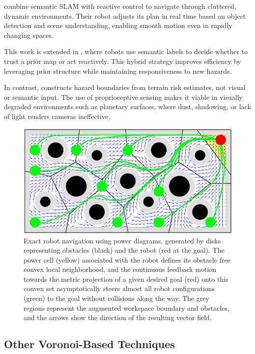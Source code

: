 \textcite{Vasilopoulos_RAL_2020} combine semantic SLAM with reactive control to navigate through cluttered, dynamic environments. Their robot adjusts its plan in real time based on object detection and scene understanding, enabling smooth motion even in rapidly changing spaces.

This work is extended in \textcite{vasilopoulos2021reactivenavigationpartiallyfamiliar}, where robots use semantic labels to decide whether to trust a prior map or act reactively. This hybrid strategy improves efficiency by leveraging prior structure while maintaining responsiveness to new hazards.

In contrast, \algoname{} constructs hazard boundaries from terrain risk estimates, not visual or semantic input. The use of proprioceptive sensing makes it viable in visually degraded environments such as planetary surfaces, where dust, shadowing, or lack of light renders cameras ineffective.

\begin{figure}[h]
\centering
\includegraphics[width=0.7\linewidth]{figures/Exact-robot-navigation-using-power-diagrams-generated-by-disks-representing-obstacles.png}
\caption{Exact robot navigation using power diagrams, generated by disks representing obstacles (black) and the robot (red at the goal). The power cell (yellow) associated with the robot defines its obstacle free convex local neighborhood, and the continuous feedback motion towards the metric projection of a given desired goal (red) onto this convex set asymptotically steers almost all robot configurations (green) to the goal without collisions along the way. The grey regions represent the augmented workspace boundary and obstacles, and the arrows show the direction of the resulting vector field. \cite{arslan2016exactrobotnavigation}}
\label{fig:disks}
\end{figure}

\subsection{Other Voronoi-Based Techniques}

